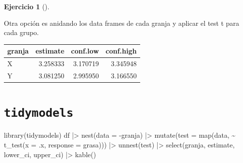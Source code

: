 \documentclass[
  a4paper,
]{scrreport}
\newenvironment{Shaded}{\begin{snugshade}}{\end{snugshade}}
\newcommand{\AttributeTok}[1]{\textcolor[rgb]{0.40,0.45,0.13}{#1}}
\newcommand{\FunctionTok}[1]{\textcolor[rgb]{0.28,0.35,0.67}{#1}}
\newcommand{\NormalTok}[1]{\textcolor[rgb]{0.00,0.23,0.31}{#1}}
\newcommand{\OtherTok}[1]{\textcolor[rgb]{0.00,0.23,0.31}{#1}}
\newcommand{\SpecialCharTok}[1]{\textcolor[rgb]{0.37,0.37,0.37}{#1}}
\theoremstyle{definition}
\newtheorem{exercise}{Ejercicio}[chapter]
\theoremstyle{remark}
\begin{document}
\begin{exercise}[]
\begin{enumerate}
\begin{tcolorbox}
  Otra opción es anidando los data frames de cada granja y aplicar el
  test t para cada grupo.

\begin{Shaded}
\end{Shaded}

  \begin{longtable}[]{@{}lrrr@{}}
  \toprule\noalign{}
  granja & estimate & conf.low & conf.high \\
  \midrule\noalign{}
  \endhead
  \bottomrule\noalign{}
  \endlastfoot
  X & 3.258333 & 3.170719 & 3.345948 \\
  Y & 3.081250 & 2.995950 & 3.166550 \\
  \end{longtable}

  \section{\texorpdfstring{\texttt{tidymodels}}{tidymodels}}

\begin{Shaded}
\begin{Highlighting}[]
\FunctionTok{library}\NormalTok{(tidymodels)}
\NormalTok{df }\SpecialCharTok{|\textgreater{}} 
    \FunctionTok{nest}\NormalTok{(}\AttributeTok{data =} \SpecialCharTok{{-}}\NormalTok{granja) }\SpecialCharTok{|\textgreater{}} 
    \FunctionTok{mutate}\NormalTok{(}\AttributeTok{test =} \FunctionTok{map}\NormalTok{(data, }\SpecialCharTok{\textasciitilde{}} \FunctionTok{t\_test}\NormalTok{(}\AttributeTok{x =}\NormalTok{ .x, }\AttributeTok{response =}\NormalTok{ grasa))) }\SpecialCharTok{|\textgreater{}} 
    \FunctionTok{unnest}\NormalTok{(test) }\SpecialCharTok{|\textgreater{}} 
    \FunctionTok{select}\NormalTok{(granja, estimate, lower\_ci, upper\_ci) }\SpecialCharTok{|\textgreater{}} 
    \FunctionTok{kable}\NormalTok{()}
\end{Highlighting}
\end{Shaded}


\end{tcolorbox}
\end{enumerate}
\end{exercise}
\end{document}
